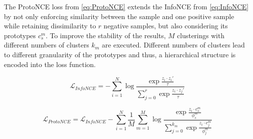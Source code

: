 The ProtoNCE loss from \eqref{eq:ProtoNCE} extends the InfoNCE from \eqref{eq:InfoNCE} 
by not only enforcing similarity between the sample and 
one positive sample while retaining dissimilarity to $r$ negative samples, 
but also considering its prototypes $c^m_s$. 
To improve the stability of the results, $M$ clusterings with different numbers of clusters $k_m$ are 
executed.
Different numbers of clusters lead to different granularity of the prototypes 
and thus, a hierarchical structure is encoded into the loss function.

\begin{equation}
    \mathcal{L}_{InfoNCE}= - \sum_{i=1}^{N}\log\frac{\exp \frac{z_i\cdot z_i'}{\tau}}{\sum_{j=0}^{r}\exp \frac{z_i\cdot z_j'}{\tau}}
    \label{eq:InfoNCE}
\end{equation}

\begin{equation}
    \mathcal{L}_{ProtoNCE}=\mathcal{L}_{InfoNCE} - \sum_{i=1}^{N} \frac{1}{M} \sum_{m=1}^{M} \log\frac{\exp \frac{z_i\cdot c_s^m}{\phi^m_s}}{\sum_{j=0}^{k_m}\exp \frac{z_i\cdot c_j^m}{\phi^m_j}}
    \label{eq:ProtoNCE}
\end{equation}


